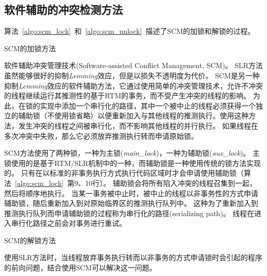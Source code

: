 \subsection{软件辅助的冲突检测方法}

算法~\ref{algo:scm_lock}~和~\ref{algo:scm_unlock}~描述了SCM的加锁和解锁的过程。

\begin{algorithm}[htbp]
\SetAlgoLined
{}
\caption{SCM的加锁方法}
\label{algo:scm_lock}
\end{algorithm}

软件辅助冲突管理技术(Software-assisted Conflict Management, SCM)。
SLR方法虽然能够很好的抑制\textit{Lemming}效应，但是以损失不透明度为代价。
SCM是另一种抑制\textit{Lemming}效应的软件辅助方法，它通过使用简单的冲突管理技术，允许不冲突的线程继续运行其推测性的基于RTM的事务，而不受产生冲突的线程的影响。
为此，在锁的实现中添加一个串行化的路径，其中一个被中止的线程必须获得一个独立的辅助锁（不使用锁省略）以便重新加入与其他线程的推测执行。使用这种方法，发生冲突的线程之间被串行化，而不影响其他线程的并行执行。
如果线程在多次冲突中失败，那么它必须放弃推测执行转而申请原始锁。

SCM方法使用了两种锁，一种为主锁(\textit{main\_lock})，一种为辅助锁(\textit{aux\_lock})。
主锁使用的是基于RTM/SLR机制中的一种，而辅助锁是一种使用传统的锁方法实现的。
只有在以标准的非事务执行方式执行代码区域时才会申请使用辅助锁（算法~\ref{algo:scm_lock}~第9、10行）。
辅助锁会将所有陷入冲突的线程召集到一起，然后将顺序地执行。
当某一事务被中止时，被中止的线程以非事务性的方式申请辅助锁，随后重新加入到对原始临界区的推测执行队列中。
这种为了重新加入到推测执行队列而申请辅助锁的过程称为串行化的路径(serializing path)。
线程在进入串行化路径之前会对事务进行重试。

\begin{algorithm}[htbp]
\caption{SCM的解锁方法}
\label{algo:scm_unlock}
\end{algorithm}
使用SLR方法时，当线程放弃事务执行转而以非事务的方式申请锁时会引起的程序的前向问题，结合使用SCM可以解决这一问题。

